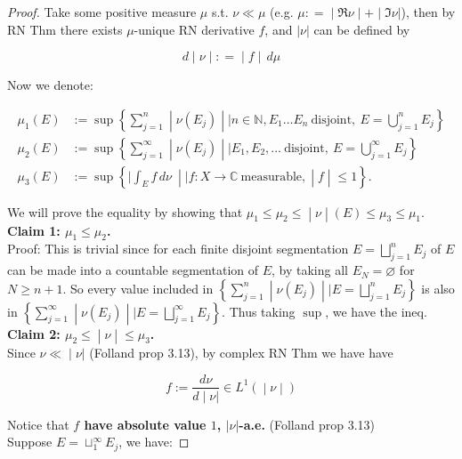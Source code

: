 \begin{proof}

Take some positive measure \(\mu\) s.t. \(\nu \ll \mu\) (e.g. \(\left. \mu: = \middle| \Re\nu \middle| + \middle| \Im\nu| \right.\)), then by RN Thm there exists \(\mu\)-unique RN derivative \(f\), and \(|\nu|\) can be defined by

\[\left. d \middle| \nu \middle| : = \middle| f \middle| \, d\mu \right.\]

Now we denote:

\[\begin{matrix}
{\mu_{1}(E)} & {:= \sup\left\{ \sum\limits_{j = 1}^{n} \middle| \nu(E_{j}) \middle| \mid n \in \mathbb{N},E_{1}\ldots E_{n}\ \text{disjoint},\ E = \bigcup\limits_{j = 1}^{n}E_{j} \right\}} \\
{\mu_{2}(E)} & {:= \sup\left\{ \sum\limits_{j = 1}^{\infty} \middle| \nu(E_{j}) \middle| \mid E_{1},E_{2},\ldots\ \text{disjoint},\ E = \bigcup\limits_{j = 1}^{\infty}E_{j} \right\}} \\
{\mu_{3}(E)} & {:= \sup\left\{ |\int_{E}f\, d\nu\  \middle| \mid f:X\rightarrow\mathbb{C}\ \text{measurable}, \middle| f \middle| \leq 1 \right\}.}
\end{matrix}\]

We will prove the equality by showing that \(\left. \mu_{1} \leq \mu_{2} \leq \middle| \nu \middle| (E) \leq \mu_{3} \leq \mu_{1} \right.\).\\
\textbf{Claim 1: \(\mu_{1} \leq \mu_{2}\).}\\
Proof: This is trivial since for each finite disjoint segmentation \(E = \bigsqcup_{j = 1}^{n}E_{j}\) of \(E\) can be made into a countable segmentation of \(E\), by taking all \(E_{N} = \varnothing\) for \(N \geq n + 1\). So every value included in \(\left\{ \sum_{j = 1}^{n} \middle| \nu(E_{j}) \middle| \mid E = \bigsqcup_{j = 1}^{n}E_{j} \right\}\) is also in \(\left\{ \sum_{j = 1}^{\infty} \middle| \nu(E_{j}) \middle| \mid E = \bigsqcup_{j = 1}^{\infty}E_{j} \right\}\). Thus taking \(\sup\), we have the ineq.\\
\textbf{Claim 2: \(\left. \mu_{2} \leq \middle| \nu \middle| \leq \mu_{3} \right.\).}\\
Since \(\left. \nu \ll \middle| \nu| \right.\) (Folland prop 3.13), by complex RN Thm we have have

\[\left. f := \frac{d\nu}{\left. d \middle| \nu| \right.} \in L^{1}( \middle| \nu \middle| ) \right.\]

Notice that \textbf{\(f\) have absolute value \(1\), \(|\nu|\)-a.e.} (Folland prop 3.13)\\
Suppose \(E = \sqcup_{1}^{\infty}E_{j}\), we have:


\end{proof}
